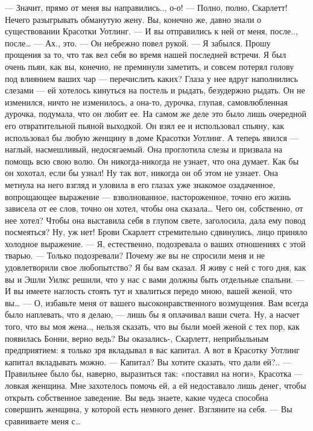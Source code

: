 — Значит, прямо от меня вы направились.., о-о!
— Полно, полно, Скарлетт! Нечего разыгрывать обманутую жену. Вы, конечно же, давно знали о существовании Красотки Уотлинг. — И вы отправились к ней от меня, после.., после…
— Ах., это. — Он небрежно повел рукой. — Я забылся. Прошу прощения за то, что так вел себя во время нашей последней встречи. Я был очень пьян, как вы, конечно, не преминули заметить, и совсем потерял голову под влиянием ваших чар — перечислить каких?
Глаза у нее вдруг наполнились слезами — ей хотелось кинуться на постель и рыдать, безудержно рыдать. Он не изменился, ничто не изменилось, а она-то, дурочка, глупая, самовлюбленная дурочка, подумала, что он любит ее. На самом же деле это было лишь очередной его отвратительной пьяной выходкой. Он взял ее и использовал спьяну, как использовал бы любую женщину в доме Красотки Уотлинг. А теперь явился — наглый, насмешливый, недосягаемый. Она проглотила слезы и призвала на помощь всю свою волю. Он никогда-никогда не узнает, что она думает. Как бы он хохотал, если бы узнал! Ну так вот, никогда он об этом не узнает. Она метнула на него взгляд и уловила в его глазах уже знакомое озадаченное, вопрощающее выражение — взволнованное, настороженное, точно его жизнь зависела от ее слов, точно он хотел, чтобы она сказала… Чего он, собственно, от нее хотел? Чтобы она выставила себя в глупом свете, заголосила, дала ему повод посмеяться? Ну, уж нет! Брови Скарлетт стремительно сдвинулись, лицо приняло холодное выражение.
— Я, естественно, подозревала о ваших отношениях с этой тварью.
— Только подозревали? Почему же вы не спросили меня и не удовлетворили свое любопытство? Я бы вам сказал. Я живу с ней с того дня, как вы и Эшли Уилкс решили, что у нас с вами должны быть отдельные спальни.
— И вы имеете наглость стоять тут и хвалиться передо мною, вашей женой, что вы…
— О, избавьте меня от вашего высоконравственного возмущения. Вам всегда было наплевать, что я делаю, — лишь бы я оплачивал ваши счета. Ну, а насчет того, что вы моя жена.., нельзя сказать, что вы были моей женой с тех пор, как появилась Бонни, верно ведь? Вы оказались-, Скарлетт, неприбыльным предприятием: я только зря вкладывал в вас капитал. А вот в Красотку Уотлинг капитал вкладывать можно.
— Капитал? Вы хотите сказать, что дали ей?..
— Правильнее было бы, наверно, выразиться так: «поставил на ноги», Красотка — ловкая женщина. Мне захотелось помочь ей, а ей недоставало лишь денег, чтобы открыть собственное заведение. Вы ведь знаете, какие чудеса способна совершить женщина, у которой есть немного денег. Взгляните на себя.
— Вы сравниваете меня с…
